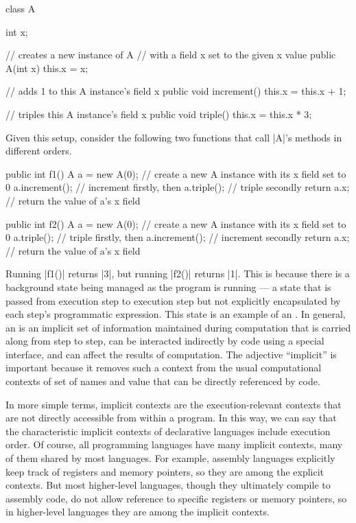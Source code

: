 \begin{snippet-Java}
class A {
  int x;

  // creates a new instance of A
  // with a field x set to the given x value
  public A(int x) {
    this.x = x;
  }

  // adds 1 to this A instance's field x
  public void increment() {
    this.x = this.x + 1;
  }

  // triples this A instance's field x
  public void triple() {
    this.x = this.x * 3;
  }
}
\end{snippet-Java}
Given this setup, consider the following two functions that call \code|A|'s methods in different orders.
\begin{snippet-Java}
public int f1() {
  A a = new A(0); // create a new A instance with its x field set to 0
  a.increment();  // increment firstly, then
  a.triple();     // triple secondly
  return a.x;     // return the value of a's x field
}

public int f2() {
  A a = new A(0); // create a new A instance with its x field set to 0
  a.triple();     // triple firstly, then
  a.increment();  // increment secondly
  return a.x;     // return the value of a's x field
}
\end{snippet-Java}

Running \code|f1()| returns \code|3|, but
running \code|f2()| returns \code|1|.
This is because there is a background state being managed as the program is running --- a state that is passed from execution step to execution step but not explicitly encapsulated by each step's programmatic expression.
This state is an example of an .
In general, an  is an implicit set of information maintained during computation that
is carried along from step to step,
can be interacted indirectly by code using a special interface, and
can affect the results of computation.
The adjective ``implicit'' is important because it removes such a context from the usual computational contexts of set of names and value that can be directly referenced by code.

In more simple terms, implicit contexts are the execution-relevant contexts that are not directly accessible from within a program.
In this way, we can say that the characteristic implicit contexts of declarative languages include execution order.
Of course, all programming languages have many implicit contexts, many of them shared by most languages.
For example, assembly languages explicitly keep track of registers and memory pointers, so they are among the explicit contexts.
But most higher-level languages, though they ultimately compile to assembly code, do not allow reference to specific registers or memory pointers, so in higher-level languages they are among the implicit contexts.

